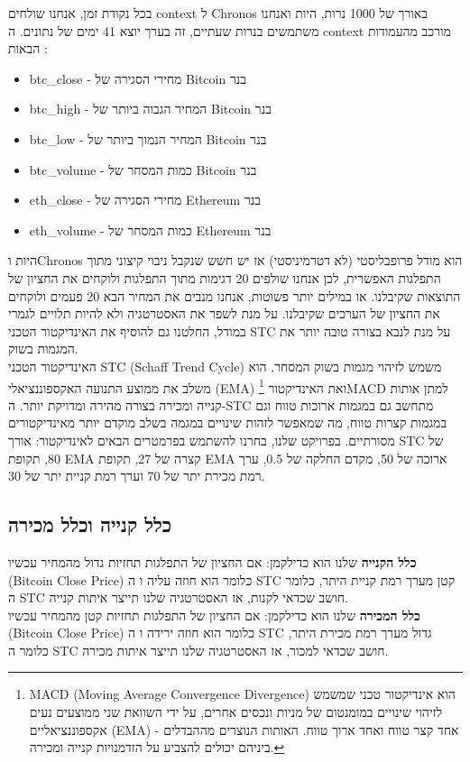 \documentclass[a4paper,11pt]{article}
\newcommand{\te}[1]{\textenglish{#1}}
\begin{document}
\begin{RTL}
בכל נקודת זמן, אנחנו שולחים \te{context} ל \te{Chronos} באורך של 1000 נרות, היות ואנחנו משתמשים בנרות שעתיים, זה בערך יוצא 41 ימים של נתונים. ה \te{context} מורכב מהעמודות הבאות :
\begin{itemize}
    \item \te{btc\_close} - מחירי הסגירה של \te{Bitcoin} בנר
    \item \te{btc\_high} - המחיר הגבוה ביותר של \te{Bitcoin} בנר
    \item \te{btc\_low} - המחיר הנמוך ביותר של \te{Bitcoin} בנר
    \item \te{btc\_volume} - כמות המסחר של \te{Bitcoin} בנר
    \item \te{eth\_close} - מחירי הסגירה של \te{Ethereum} בנר
    \item \te{eth\_volume} - כמות המסחר של \te{Ethereum} בנר
\end{itemize}
היות ו\te{Chronos} הוא מודל פרופבליסטי (לא דטרמיניסטי) אז יש חשש שנקבל ניבוי קיצוני מתוך התפלגות האפשרית, לכן אנחנו שולפים 20 דגימות מתוך התפלגות ולוקחים את החציון של התוצאות שקיבלנו. או במילים יותר פשוטות, אנחנו מנבים את המחיר הבא 20 פעמים ולוקחים את החציון של הערכים שקיבלנו. על מנת לשפר את האסטרטגיה ולא להיות תלויים לגמרי במודל, החלטנו גם להוסיף את האינדיקטור הטכני \te{STC} על מנת לנבא בצורה טובה יותר את המגמות בשוק.
\\
האינדיקטור הטכני \te{STC (Schaff Trend Cycle)} משמש לזיהוי מגמות בשוק המסחר. הוא משלב את ממוצע התנועה האקספוננציאלי \te{(EMA)} ואת האינדיקטור \footnote{\te{MACD (Moving Average Convergence Divergence)} הוא אינדיקטור טכני שמשמש לזיהוי שינויים במומנטום של מניות ונכסים אחרים, על ידי השוואת שני ממוצעים נעים אקספוננציאליים \te{(EMA)} - אחד קצר טווח ואחד ארוך טווח. האותות הנוצרים מההבדלים ביניהם יכולים להצביע על הזדמנויות קנייה ומכירה.}\te{MACD} למתן אותות קנייה ומכירה בצורה מהירה ומדויקת יותר. ה-\te{STC} מתחשב גם במגמות ארוכות טווח וגם במגמות קצרות טווח, מה שמאפשר לזהות שינויים במגמה בשלב מוקדם יותר מאינדיקטורים מסורתיים. בפרויקט שלנו, בחרנו להשתמש בפרמטרים הבאים לאינדיקטור: אורך \te{STC} של 80, תקופת \te{EMA} קצרה של 27, תקופת \te{EMA} ארוכה של 50, מקדם החלקה של 0.5, ערך רמת מכירת יתר של 70 וערך רמת קניית יתר של 30.
 
\subsection*{כלל קנייה וכלל מכירה}
\textbf{כלל הקנייה} שלנו הוא כדילקמן: אם החציון של התפלגות תחזיות גדול מהמחיר עכשיו (\te{Bitcoin Close Price}) כלומר הוא חוזה עליה ו ה \te{STC} קטן מערך רמת קניית היתר, כלומר ה \te{STC} חושב שכדאי לקנות, אז האסטרטגיה שלנו תייצר איתות קנייה.
\\
\textbf{כלל המכירה} שלנו הוא כדילקמן: אם החציון של התפלגות תחזיות קטן מהמחיר עכשיו (\te{Bitcoin Close Price}) כלומר הוא חוזה ירידה ו ה \te{STC} גדול מערך רמת מכירת היתר, כלומר ה \te{STC} חושב שכדאי למכור, אז האסטרטגיה שלנו תייצר איתות מכירה.


\end{RTL}
\end{document}
